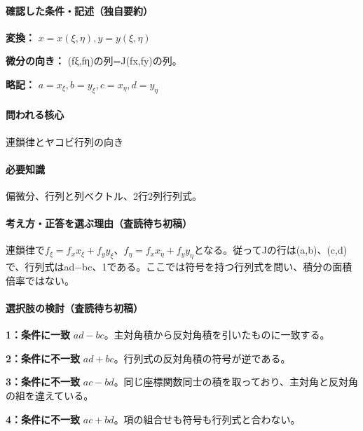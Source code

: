 \paragraph{確認した条件・記述（独自要約）}\mbox{}\par

\noindent\textbf{変換：} \(x=x(\xi,\eta),y=y(\xi,\eta)\)\par

\noindent\textbf{微分の向き：} (fξ,fη)の列=J(fx,fy)の列。\par

\noindent\textbf{略記：} \(a=x_\xi,b=y_\xi,c=x_\eta,d=y_\eta\)\par

\paragraph{問われる核心} 連鎖律とヤコビ行列の向き

\paragraph{必要知識} 偏微分、行列と列ベクトル、2行2列行列式。

\paragraph{考え方・正答を選ぶ理由（査読待ち初稿）} 連鎖律で\(f_\xi=f_xx_\xi+f_yy_\xi\)、\(f_\eta=f_xx_\eta+f_yy_\eta\)となる。従ってJの行は(a,b)、(c,d)で、行列式はad−bc、1である。ここでは符号を持つ行列式を問い、積分の面積倍率ではない。

\paragraph{選択肢の検討（査読待ち初稿）}\mbox{}\par

\noindent\textbf{1：条件に一致} \(ad-bc\)。主対角積から反対角積を引いたものに一致する。\par

\noindent\textbf{2：条件に不一致} \(ad+bc\)。行列式の反対角積の符号が逆である。\par

\noindent\textbf{3：条件に不一致} \(ac-bd\)。同じ座標関数同士の積を取っており、主対角と反対角の組を違えている。\par

\noindent\textbf{4：条件に不一致} \(ac+bd\)。項の組合せも符号も行列式と合わない。\par

